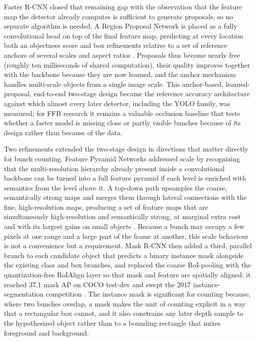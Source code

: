 Faster R-CNN closed that remaining gap with the observation that the feature map the detector already computes is sufficient to generate proposals, so no separate algorithm is needed. A Region Proposal Network is placed as a fully convolutional head on top of the final feature map, predicting at every location both an objectness score and box refinements relative to a set of reference anchors of several scales and aspect ratios \cite{ren2017fasterrcnn}. Proposals thus become nearly free (roughly ten milliseconds of shared computation), their quality improves together with the backbone because they are now learned, and the anchor mechanism handles multi-scale objects from a single image scale. This anchor-based, learned-proposal, end-to-end two-stage design became the reference accuracy architecture against which almost every later detector, including the YOLO family, was measured; for FFB research it remains a valuable occlusion baseline that tests whether a faster model is missing close or partly visible bunches because of its design rather than because of the data.

Two refinements extended the two-stage design in directions that matter directly for bunch counting. Feature Pyramid Networks addressed scale by recognizing that the multi-resolution hierarchy already present inside a convolutional backbone can be turned into a full feature pyramid if each level is enriched with semantics from the level above it. A top-down path upsamples the coarse, semantically strong maps and merges them through lateral connections with the fine, high-resolution maps, producing a set of feature maps that are simultaneously high-resolution and semantically strong, at marginal extra cost and with its largest gains on small objects \cite{lin2017fpn}. Because a bunch may occupy a few pixels at one range and a large part of the frame at another, this scale behaviour is not a convenience but a requirement. Mask R-CNN then added a third, parallel branch to each candidate object that predicts a binary instance mask alongside the existing class and box branches, and replaced the coarse RoI-pooling with the quantization-free RoIAlign layer so that mask and feature are spatially aligned; it reached 37.1 mask AP on COCO test-dev and swept the 2017 instance-segmentation competition \cite{he2017maskrcnn}. The instance mask is significant for counting because, where two bunches overlap, a mask makes the unit of counting explicit in a way that a rectangular box cannot, and it also constrains any later depth sample to the hypothesized object rather than to a bounding rectangle that mixes foreground and background.

